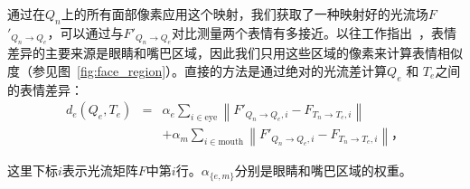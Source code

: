 通过在$Q_n$上的所有面部像素应用这个映射，我们获取了一种映射好的光流场\mbox{\boldmath $F$}$'_{Q_n \to Q_e}$，可以通过与\mbox{\boldmath $F$}$'_{Q_n \to Q_e}$对比测量两个表情有多接近。以往工作指出~\cite{eccv10}，表情差异的主要来源是眼睛和嘴巴区域，因此我们只用这些区域的像素来计算表情相似度（参见图~\ref{fig:face_region}）。直接的方法是通过绝对的光流差计算$Q_e$ 和 $T_e$之间的表情差异：
\setlength\arraycolsep{1pt}
\begin{eqnarray}\label{eq:dist_mag}
d_e(Q_e, T_e)&=& \alpha_{e}\sum_{i\in\text{eye}}\left\|F'_{Q_n \to Q_e,i} -F_{T_n \to T_e,i}\right\| \nonumber\\
  &&+\alpha_{m}\sum_{i\in\text{mouth}}\left\|F'_{Q_n \to Q_e, i} -F_{T_n \to T_e, i}\right\|，
\end{eqnarray}

这里下标$i$表示光流矩阵\mbox{\boldmath $F$}中第$i$行。$\alpha_{\{e, m\}}$分别是眼睛和嘴巴区域的权重。
